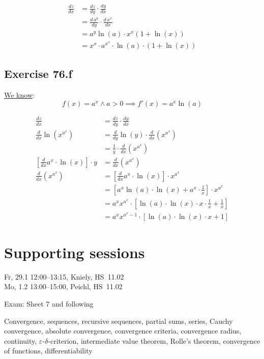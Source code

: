 \documentclass[a4paper]{article}
\theoremstyle{definition}
\begin{document}
\begin{align*}
  \frac{dz}{dx} &= \frac{dz}{dy} \cdot \frac{dy}{dx} \\
    &= \frac{d \, a^y}{dy} \cdot \frac{d\, x^x}{dx} \\
    &= a^y \ln(a) \cdot x^x (1 + \ln(x)) \\
    &= x^x \cdot a^{x^x} \cdot \ln(a) \cdot (1 + \ln(x))
\end{align*}

\subsection{Exercise 76.f}

\href{https://math.stackexchange.com/a/1755387/38726}{We know}:
\[ f(x) = a^x \land a > 0 \implies f'(x) = a^x \ln(a) \]

\begin{align*}
  \frac{dz}{dx} &= \frac{dz}{dy} \cdot \frac{dy}{dx} \\
  \frac{d}{dx} \ln\left(x^{a^x}\right)
    &= \frac{d}{dy} \ln(y) \cdot \frac{d}{dx} \left(x^{a^x}\right) \\
    &= \frac1y \cdot \frac{d}{dx} \left(x^{a^x}\right) \\
  \left[\frac{d}{dx} a^x \cdot \ln(x)\right] \cdot y
    &= \frac{d}{dx} \left(x^{a^x}\right) \\
  \frac{d}{dx} \left(x^{a^x}\right)
    &= \left[\frac{d}{dx} a^x \cdot \ln(x)\right] \cdot x^{a^x} \\
    &= \left[a^x \ln(a) \cdot \ln(x) + a^x \cdot \frac1x\right] \cdot x^{a^x} \\
    &= a^x x^{a^x} \cdot \left[\ln(a) \cdot \ln(x) \cdot x \cdot \frac1x + \frac1x\right] \\
    &= a^x x^{a^x-1} \cdot \left[\ln(a) \cdot \ln(x) \cdot x + 1\right]
\end{align*}

\section{Supporting sessions}

Fr, 29.1 12:00--13:15, Kniely, HS~11.02 \\
Mo, 1.2 13:00--15:00, Peichl, HS~11.02

Exam: Sheet 7 and following

Convergence, sequences, recursive sequences, partial sums, series, Cauchy convergence,
absolute convergence, convergence criteria, convergence radius, continuity,
$\varepsilon$-$\delta$-criterion, intermediate value theorem, Rolle's theorem,
convergence of functions, differentiability
\end{document}
